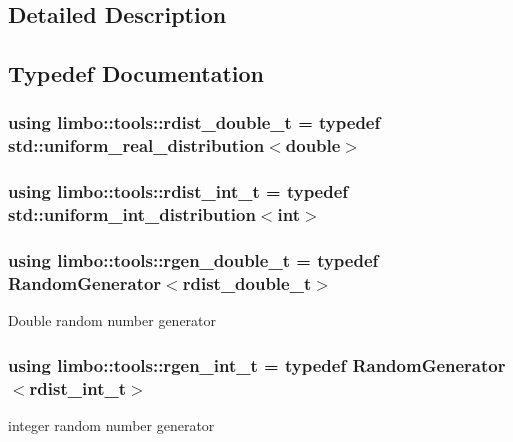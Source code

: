 \subsection{Detailed Description}


\subsection{Typedef Documentation}
\hypertarget{group__tools_gab2609bfef1e3bdb8b44c0d6c8c139927}{}
\subsubsection[{rdist\+\_\+double\+\_\+t}]{\setlength{\rightskip}{0pt plus 5cm}using {\bf limbo\+::tools\+::rdist\+\_\+double\+\_\+t} = typedef std\+::uniform\+\_\+real\+\_\+distribution$<$double$>$}\label{group__tools_gab2609bfef1e3bdb8b44c0d6c8c139927}
\hypertarget{group__tools_gacb322b4600b2e500dbcd24661a749f49}{}
\subsubsection[{rdist\+\_\+int\+\_\+t}]{\setlength{\rightskip}{0pt plus 5cm}using {\bf limbo\+::tools\+::rdist\+\_\+int\+\_\+t} = typedef std\+::uniform\+\_\+int\+\_\+distribution$<$int$>$}\label{group__tools_gacb322b4600b2e500dbcd24661a749f49}
\hypertarget{group__tools_gacdb2963659056fc5fa9f94405f59a851}{}
\subsubsection[{rgen\+\_\+double\+\_\+t}]{\setlength{\rightskip}{0pt plus 5cm}using {\bf limbo\+::tools\+::rgen\+\_\+double\+\_\+t} = typedef Random\+Generator$<$rdist\+\_\+double\+\_\+t$>$}\label{group__tools_gacdb2963659056fc5fa9f94405f59a851}
Double random number generator \hypertarget{group__tools_ga3df78ebcb864be91e73e840bb42b9208}{}
\subsubsection[{rgen\+\_\+int\+\_\+t}]{\setlength{\rightskip}{0pt plus 5cm}using {\bf limbo\+::tools\+::rgen\+\_\+int\+\_\+t} = typedef Random\+Generator$<$rdist\+\_\+int\+\_\+t$>$}\label{group__tools_ga3df78ebcb864be91e73e840bb42b9208}
integer random number generator 

